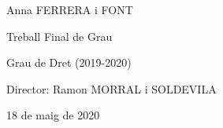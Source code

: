\documentclass[12pt]{article}
\begin{document}
\vspace{\baselineskip}

\vspace{\baselineskip}

\vspace{\baselineskip}

\vspace{\baselineskip}

\vspace{\baselineskip}

\vspace{\baselineskip}

\vspace{\baselineskip}

\vspace{\baselineskip}

\vspace{\baselineskip}

\vspace{\baselineskip}
\begin{Center}
Anna FERRERA i FONT
\end{Center}\par


\vspace{\baselineskip}
\begin{Center}
Treball Final de Grau 
\end{Center}\par


\vspace{\baselineskip}
\begin{Center}
Grau de Dret (2019-2020)
\end{Center}\par


\vspace{\baselineskip}
\begin{Center}
Director: Ramon MORRAL i SOLDEVILA
\end{Center}\par


\vspace{\baselineskip}
\begin{Center}
18 de maig de 2020
\end{Center}\par


\vspace{\baselineskip}

\vspace{\baselineskip}

\vspace{\baselineskip}
\end{document}
